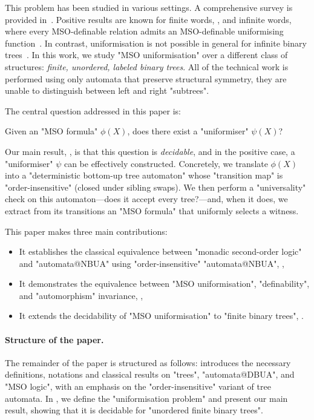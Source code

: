 \documentclass[a4paper,UKenglish,cleveref, autoref, thm-restate]{lipics-v2021}
\begin{document}
This problem has been studied in various settings. A comprehensive survey is provided in~\cite{Cara15}. Positive results are known for finite words, \cite{Choffrut1999}, 
and infinite words, where every MSO-definable relation admits an MSO-definable uniformising function~\cite{Siefkes1975, Choffrut1999, Rabin07}. In contrast, uniformisation 
is not possible in general for infinite binary trees~\cite{GS83}.
In this work, we study "MSO uniformisation" over a different class of structures: \emph{finite, unordered, labeled binary trees}.
All of the technical work is performed using only automata that preserve structural symmetry,
\ie they are unable to distinguish between left and right "subtrees".

The central question addressed in this paper is:

\begin{problem}\label{prob:uniformisation-problem}
\AP Given an "MSO formula" $\phi(X)$, does there exist a "uniformiser" $\psi(X)$?
\end{problem}

Our main result, , is that this question is \emph{decidable}, and in the positive case, a "uniformiser" $\psi$ can be effectively constructed. Concretely, we translate $\phi(X)$ into a
"deterministic bottom-up tree automaton" whose "transition map" is "order-insensitive" (\ie closed under sibling swaps). We then perform a "universality" check on this
automaton—does it accept every tree?—and, when it does, we extract from its transitions an "MSO formula" that uniformly selects a witness.

This paper makes three main contributions:
\begin{itemize}
	\item It establishes the classical equivalence between "monadic second-order logic" and "automata@NBUA" using "order-insensitive" "automata@NBUA", ,
	\item It demonstrates the equivalence between "MSO uniformisation", "definability", and "automorphism" invariance, ,
	\item It extends the decidability of "MSO uniformisation" to "finite binary trees", .
\end{itemize}


\paragraph*{Structure of the paper.} The remainder of the paper is structured as follows:
 introduces the necessary definitions, notations and classical results on "trees", "automata@DBUA", and "MSO logic", with an emphasis on the "order-insensitive"
variant of tree automata.
In , we define the "uniformisation problem" and present our main result, showing that it is decidable for "unordered finite binary trees".
\end{document}

